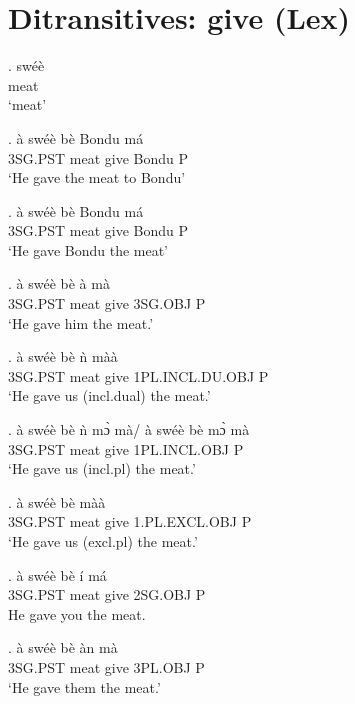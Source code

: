 \documentclass{assets/fieldnotes}
\begin{document}
\section{Ditransitives: give (Lex)}


\exg. swéè\\
meat\\
`meat'


\exg. à swéè bè Bondu má\\
3SG.PST meat give Bondu P\\
`He gave the meat to Bondu' 

\exg.  à swéè bè Bondu má\\
3SG.PST meat give Bondu P\\
`He gave Bondu the meat'

\exg. à swéè bè à mà\\
3SG.PST meat give 3SG.OBJ P\\
`He gave him the meat.'

\exg. à swéè bè ǹ màà\\
3SG.PST meat give 1PL.INCL.DU.OBJ P\\
`He gave us (incl.dual) the meat.'

\exg. à swéè bè ǹ mɔ̀ mà/ à swéè bè mɔ̀ mà\\
3SG.PST meat give 1PL.INCL.OBJ P\\
`He gave us (incl.pl) the meat.'



\exg. à swéè bè màà\\
3SG.PST meat give 1.PL.EXCL.OBJ P\\
`He gave us (excl.pl) the meat.'


\exg. à swéè bè í má\\
3SG.PST meat give 2SG.OBJ P\\
He gave you the meat.

\exg. à swéè bè àn mà\\
3SG.PST meat give 3PL.OBJ P\\
`He gave them the meat.'

\end{document}
